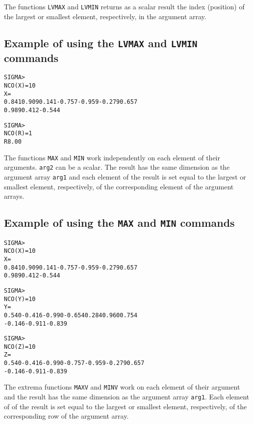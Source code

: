 
The functions \texttt{LVMAX} and \texttt{LVMIN}
returns as a scalar result the index (position) of
the largest or smallest element, respectively,
in the argument array.

\subsection*{Example of using the \texttt{LVMAX} and \texttt{LVMIN}
  commands}
\begin{alltt}
 SIGMA >
 NCO(X       )=   10
 X       =
  0.841     0.909     0.141    -0.757    -0.959    -0.279     0.657
  0.989     0.412    -0.544
 
 SIGMA >
 NCO(R       )=    1
 R         8.00
\end{alltt}
 
 
The functions \texttt{MAX} and \texttt{MIN} work
independently on each element of their arguments.
\texttt{arg2} can be a scalar.
The result has the same dimension as the argument array 
\texttt{arg1} and each element of
the result is set equal to the largest or smallest element, respectively,
of the corresponding element of the argument arrays.

\subsection*{Example of using the \texttt{MAX} and \texttt{MIN}
  commands}
\begin{alltt}
 SIGMA >
 NCO(X       )=   10
 X       =
  0.841     0.909     0.141    -0.757    -0.959    -0.279     0.657
  0.989     0.412    -0.544
 
 SIGMA >
 NCO(Y       )=   10
 Y       =
  0.540    -0.416    -0.990    -0.654     0.284     0.960     0.754
 -0.146    -0.911    -0.839
 
 SIGMA >
 NCO(Z       )=   10
 Z       =
  0.540    -0.416    -0.990    -0.757    -0.959    -0.279     0.657
 -0.146    -0.911    -0.839
\end{alltt}


The extrema functions \texttt{MAXV} and \texttt{MINV} work
on each element of their argument and
the result has the same dimension as the argument array \texttt{arg1}. 
Each element of
of the result is set equal to the largest or smallest element, respectively,
of the corresponding row of the argument array.
 
